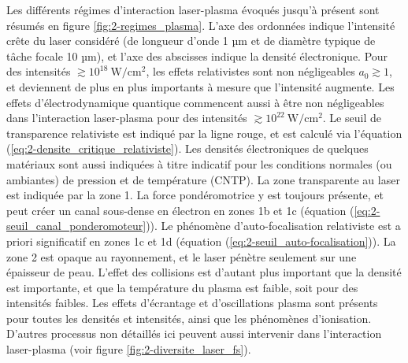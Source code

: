 \begin{refsection}
Les différents régimes d'interaction laser-plasma évoqués jusqu'à présent sont résumés en figure \ref{fig:2-regimes_plasma}. L'axe des ordonnées indique l'intensité crête du laser considéré (de longueur d'onde 1 µm et de diamètre typique de tâche focale 10 µm), et l'axe des abscisses indique la densité électronique. Pour des intensités $\gtrsim 10^{18} ~ \si{\W \per \cm^2}$, les effets relativistes sont non négligeables $a_0 \gtrsim 1$, et deviennent de plus en plus importants à mesure que l'intensité augmente. Les effets d'électrodynamique quantique commencent aussi à être non négligeables dans l'interaction laser-plasma pour des intensités $\gtrsim 10^{22} ~ \si{\W \per \cm^2}$. Le seuil de transparence relativiste est indiqué par la ligne rouge, et est calculé via l'équation (\ref{eq:2-densite_critique_relativiste}). Les densités électroniques de quelques matériaux sont aussi indiquées à titre indicatif pour les conditions normales (ou ambiantes) de pression et de température (CNTP). La zone transparente au laser est indiquée par la zone 1. La force pondéromotrice y est toujours présente, et peut créer un canal sous-dense en électron en zones 1b et 1c (équation (\ref{eq:2-seuil_canal_ponderomoteur})). Le phénomène d'auto-focalisation relativiste est a priori significatif en zones 1c et 1d (équation (\ref{eq:2-seuil_auto-focalisation})). La zone 2 est opaque au rayonnement, et le laser pénètre seulement sur une épaisseur de peau. L'effet des collisions est d'autant plus important que la densité est importante, et que la température du plasma est faible, soit pour des intensités faibles. Les effets d'écrantage et d'oscillations plasma sont présents pour toutes les densités et intensités, ainsi que les phénomènes d'ionisation. D'autres processus non détaillés ici peuvent aussi intervenir dans l'interaction laser-plasma (voir figure \ref{fig:2-diversite_laser_fs}).


\end{refsection}
